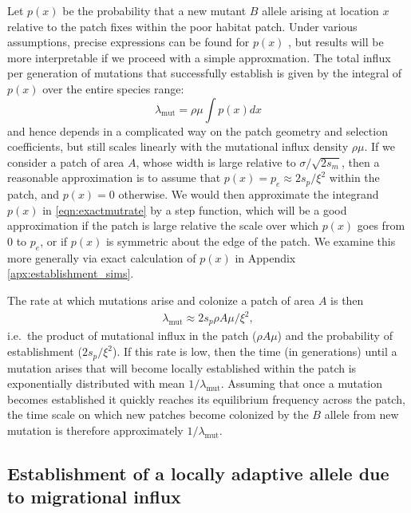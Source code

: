 \documentclass{article}
\newcommand{\mutrate}{\lambda_\text{mut}}
\begin{document}
Let $p(x)$ be the probability that a new mutant $B$ allele arising at location $x$
relative to the patch fixes within the poor habitat patch.
Under various assumptions, precise expressions can be found for $p(x)$ \citep{barton1987establishment},
but results will be more interpretable if we proceed with a simple approxmation.
The total influx per generation of mutations that successfully establish is given by the
integral of $p(x)$ over the entire species range:
\begin{equation}
  \mutrate = \rho \mu \int p(x) dx \label{eqn:exactmutrate}
\end{equation}
and hence depends in a complicated way on the patch geometry and selection coefficients,
but still scales linearly with the mutational influx density $\rho \mu$.
If we consider a patch of area $A$, whose width is large relative to $\sigma/\sqrt{2s_m}$, 
then a reasonable approximation is to assume that $p(x) = p_e \approx 2 s_p / \xi^2$ within the patch, and $p(x) = 0$ otherwise.
We would then approximate the integrand $p(x)$ in \eqref{eqn:exactmutrate} by a step function,
which will be a good approximation if the patch is large relative the scale over which $p(x)$ goes from 0 to $p_e$,
or if $p(x)$ is symmetric about the edge of the patch.
We examine this more generally via exact calculation of $p(x)$ in Appendix \ref{apx:establishment_sims}.

The rate at which mutations arise and colonize a patch of area $A$ is then
\begin{align} \label{eqn:mutrate} 
  \mutrate %
  \approx 2 s_p \rho A \mu / \xi^2,  
\end{align}
i.e.\ the product of mutational influx in the patch ($\rho A\mu$) and the probability of establishment ($2s_p/\xi^2$).
If this rate is low, then the time (in generations) until a mutation arises that
will become locally established within the patch is exponentially distributed with mean $1/\mutrate$.  
Assuming that once a mutation becomes established it quickly reaches its equilibrium frequency across the patch, 
the time scale on which new patches become colonized by the $B$ allele from new mutation is therefore approximately $1/\mutrate$.


\subsection{Establishment of a locally adaptive allele due to migrational influx}
\label{ss:patchymigration}
\end{document}
